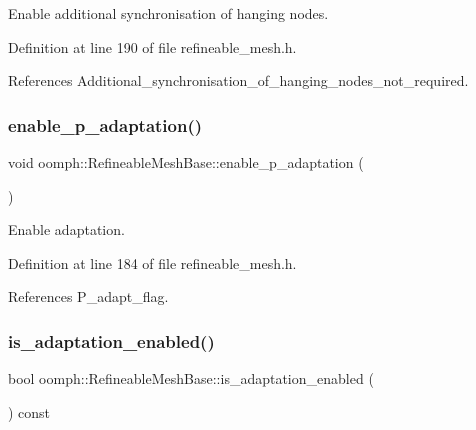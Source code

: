 Enable additional synchronisation of hanging nodes. 



Definition at line 190 of file refineable\+\_\+mesh.\+h.



References Additional\+\_\+synchronisation\+\_\+of\+\_\+hanging\+\_\+nodes\+\_\+not\+\_\+required.

\mbox{\label{classoomph_1_1RefineableMeshBase_a1c0bd748288c580dfaee4f865ac6dd36}} 
\subsubsection{\texorpdfstring{enable\+\_\+p\+\_\+adaptation()}{enable\_p\_adaptation()}}
{\footnotesize\ttfamily void oomph\+::\+Refineable\+Mesh\+Base\+::enable\+\_\+p\+\_\+adaptation (\begin{DoxyParamCaption}{ }\end{DoxyParamCaption})\hspace{0.3cm}{\ttfamily [inline]}}



Enable adaptation. 



Definition at line 184 of file refineable\+\_\+mesh.\+h.



References P\+\_\+adapt\+\_\+flag.

\mbox{\label{classoomph_1_1RefineableMeshBase_a95936de8451623e899f26a80c7b056b5}} 
\subsubsection{\texorpdfstring{is\+\_\+adaptation\+\_\+enabled()}{is\_adaptation\_enabled()}}
{\footnotesize\ttfamily bool oomph\+::\+Refineable\+Mesh\+Base\+::is\+\_\+adaptation\+\_\+enabled (\begin{DoxyParamCaption}{ }\end{DoxyParamCaption}) const\hspace{0.3cm}{\ttfamily [inline]}}



